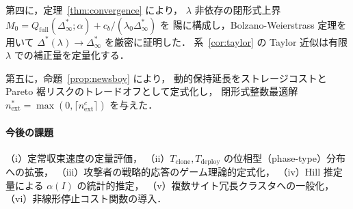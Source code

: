 \documentclass[12pt,a4paper]{article}
\theoremstyle{plain}
\theoremstyle{definition}
\theoremstyle{remark}
\newcommand{\Qf}{Q_{\mathrm{full}}}
\newcommand{\alphI}{\alpha(I)}
\newcommand{\Dopt}{\Delta^{*}}
\newcommand{\Dinf}{\Delta^{*}_{\infty}}
\begin{document}
第四に，定理~\ref{thm:convergence} により，
$\lambda$ 非依存の閉形式上界 $M_0=\Qf(\Dinf;\alpha)+c_b/(\lambda_0\Dinf)$ を
陽に構成し，Bolzano-Weierstrass 定理を用いて $\Dopt(\lambda)\to\Dinf$ を厳密に証明した．
系~\ref{cor:taylor} の Taylor 近似は有限 $\lambda$ での補正量を定量化する．

第五に，命題~\ref{prop:newsboy} により，
動的保持延長をストレージコストと Pareto 裾リスクのトレードオフとして定式化し，
閉形式整数最適解 $n_{\mathrm{ext}}^*=\max(0,\lceil n_{\mathrm{ext}}^c\rceil)$ を与えた．

\paragraph{今後の課題}
（i）定常収束速度の定量評価，
（ii）$T_{\mathrm{clone}},T_{\mathrm{deploy}}$ の位相型（phase-type）分布への拡張，
（iii）攻撃者の戦略的応答のゲーム理論的定式化，
（iv）Hill 推定量による $\alphI$ の統計的推定，
（v）複数サイト冗長クラスタへの一般化，
（vi）非線形停止コスト関数の導入．
\end{document}
